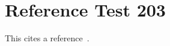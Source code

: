 \documentclass{article}
\begin{document}
\section{Reference Test 203}
This cites a reference~\cite{test203}.

\end{document}
